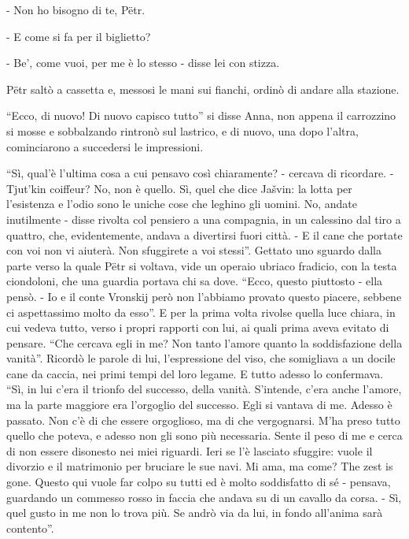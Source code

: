 - Non ho bisogno di te, Pëtr. 

- E come si fa per il biglietto? 

- Be', come vuoi, per me è lo stesso - disse lei con stizza. 

Pëtr saltò a cassetta e, messosi le mani sui fianchi, ordinò di andare alla stazione. 

\label{xxx-5} 

``Ecco, di nuovo! Di nuovo capisco tutto'' si disse Anna, non appena il carrozzino si mosse e sobbalzando rintronò sul lastrico, e di nuovo, una dopo l'altra, cominciarono a succedersi le impressioni. 

``Sì, qual'è l'ultima cosa a cui pensavo così chiaramente? - cercava di ricordare. - Tjut'kin coiffeur? No, non è quello. Sì, quel che dice Jašvin: la lotta per l'esistenza e l'odio sono le uniche cose che leghino gli uomini. No, andate inutilmente - disse rivolta col pensiero a una compagnia, in un calessino dal tiro a quattro, che, evidentemente, andava a divertirsi fuori città. - E il cane che portate con voi non vi aiuterà. Non sfuggirete a voi stessi''. Gettato uno sguardo dalla parte verso la quale Pëtr si voltava, vide un operaio ubriaco fradicio, con la testa ciondoloni, che una guardia portava chi sa dove. ``Ecco, questo piuttosto - ella pensò. - Io e il conte Vronskij però non l'abbiamo provato questo piacere, sebbene ci aspettassimo molto da esso''. E per la prima volta rivolse quella luce chiara, in cui vedeva tutto, verso i propri rapporti con lui, ai quali prima aveva evitato di pensare. ``Che cercava egli in me? Non tanto l'amore quanto la soddisfazione della vanità''. Ricordò le parole di lui, l'espressione del viso, che somigliava a un docile cane da caccia, nei primi tempi del loro legame. E tutto adesso lo confermava. ``Sì, in lui c'era il trionfo del successo, della vanità. S'intende, c'era anche l'amore, ma la parte maggiore era l'orgoglio del successo. Egli si vantava di me. Adesso è passato. Non c'è di che essere orgoglioso, ma di che vergognarsi. M'ha preso tutto quello che poteva, e adesso non gli sono più necessaria. Sente il peso di me e cerca di non essere disonesto nei miei riguardi. Ieri se l'è lasciato sfuggire: vuole il divorzio e il matrimonio per bruciare le sue navi. Mi ama, ma come? The zest is gone. Questo qui vuole far colpo su tutti ed è molto soddisfatto di sé - pensava, guardando un commesso rosso in faccia che andava su di un cavallo da corsa. - Sì, quel gusto in me non lo trova più. Se andrò via da lui, in fondo all'anima sarà contento''. 

